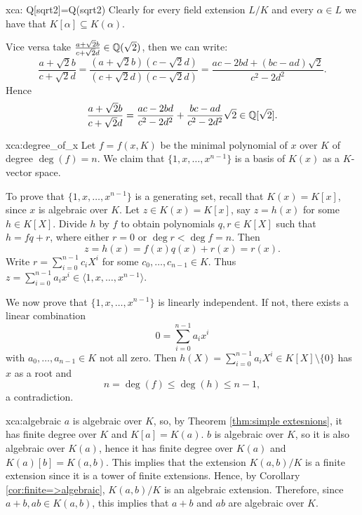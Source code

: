 \begin{sol}{xca: Q[sqrt2]=Q(sqrt2)}
Clearly for every field extension $L/K$ and 
    every $\alpha\in L$ we have that
    $K[\alpha]\subseteq K(\alpha)$.

    Vice versa take $\frac{a+\sqrt{2}b}{c+\sqrt{2}d}\in \mathbb{Q}(\sqrt{2})$,
    then we can write:
    \[
    \frac{a+\sqrt{2}b}{c+\sqrt{2}d}=\frac{(a+\sqrt{2}b)(c-\sqrt{2}d)}{(c+\sqrt{2}d)(c-\sqrt{2}d)}=
    \frac{ac-2bd+(bc-ad)\sqrt{2}}{c^2-2d^2}.
    \]
    Hence
    \[
    \frac{a+\sqrt{2}b}{c+\sqrt{2}d}=\frac{ac-2bd}{c^2-2d^2}+\frac{bc-ad}{c^2-2d^2}\sqrt{2}\in \mathbb{Q}[\sqrt{2}].
    \]
\end{sol}


\begin{sol}{xca:degree_of_x}
    Let $f=f(x,K)$ be the minimal polynomial of $x$ over $K$ of degree $\deg(f)=n$.
    We claim that $\{1,x,\dots, x^{n-1}\}$ is a basis of $K(x)$ as a $K$-vector space. 

    To prove that $\{1,x,\dots, x^{n-1}\}$ is a generating set, recall that $K(x)=K[x]$, since $x$ is algebraic over $K$. 
    Let $z\in K(x)=K[x]$, say $z=h(x)$ for some $h\in K[X]$. 
    Divide $h$ by $f$ to obtain polynomials $q,r\in K[X]$ 
    such that $h=fq+r$, where either $r=0$ or $\deg r<\deg f=n$. Then 
    \[
		z=h(x)=f(x)q(x)+r(x)=r(x).
	\]
	Write $r=\sum_{i=0}^{n-1}c_iX^i$ for some $c_0,\dots,c_{n-1}\in K$. 
    Thus $z=\sum_{i=0}^{n-1}a_ix^i\in \langle 1,x,\dots,x^{n-1}\rangle$.
        
    We now prove that $\{1,x,\dots, x^{n-1}\}$ is linearly independent. If not, 
    there exists a linear combination
    \[
    0=\sum_{i=0}^{n-1}a_ix^i
    \]
    with $a_0,\dots,a_{n-1}\in K$ not all zero. 
    Then $h(X)=\sum_{i=0}^{n-1}a_iX^i\in K[X]\setminus\{0\}$
    has $x$ as a root and 
        \[
        n=\deg(f)\leq \deg(h)\leq n-1,
        \]
       a contradiction. 
\end{sol}

\begin{sol}{xca:algebraic}
$a$ is algebraic over $K$, 
so, by Theorem \ref{thm:simple extesnions},
it has finite degree over $K$
and $K[a]=K(a)$.
$b$ is algebraic over $K$,
so it is also algebraic over $K(a)$, hence it has finite degree over $K(a)$ and 
$K(a)[b]=K(a,b)$.
This implies that the extension
$K(a,b)/K$ is a finite extension
since it is a tower of finite extensions.
Hence, by Corollary \ref{cor:finite=>algebraic}, $K(a,b)/K$ is an algebraic extension.
Therefore, since $a+b,ab\in K(a,b)$,
this implies that $a+b$ and $ab$
are algebraic over $K$.
\end{sol}

